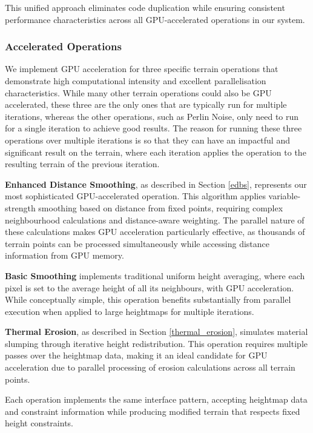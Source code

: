 This unified approach eliminates code duplication while ensuring consistent performance characteristics across all GPU-accelerated operations in our system.

\subsubsection{Accelerated Operations}

We implement GPU acceleration for three specific terrain operations that demonstrate high computational intensity and excellent parallelisation characteristics. While many other terrain operations could also be GPU accelerated, these three are the only ones that are typically run for multiple iterations, whereas the other operations, such as Perlin Noise, only need to run for a single iteration to achieve good results. The reason for running these three operations over multiple iterations is so that they can have an impactful and significant result on the terrain, where each iteration applies the operation to the resulting terrain of the previous iteration. 

\textbf{Enhanced Distance Smoothing}, as described in Section \ref{edbs}, represents our most sophisticated GPU-accelerated operation. This algorithm applies variable-strength smoothing based on distance from fixed points, requiring complex neighbourhood calculations and distance-aware weighting. The parallel nature of these calculations makes GPU acceleration particularly effective, as thousands of terrain points can be processed simultaneously while accessing distance information from GPU memory. 

\textbf{Basic Smoothing} implements traditional uniform height averaging, where each pixel is set to the average height of all its neighbours, with GPU acceleration. While conceptually simple, this operation benefits substantially from parallel execution when applied to large heightmaps for multiple iterations. 

\textbf{Thermal Erosion}, as described in Section \ref{thermal_erosion}, simulates material slumping through iterative height redistribution. This operation requires multiple passes over the heightmap data, making it an ideal candidate for GPU acceleration due to parallel processing of erosion calculations across all terrain points.

Each operation implements the same interface pattern, accepting heightmap data and constraint information while producing modified terrain that respects fixed height constraints.

